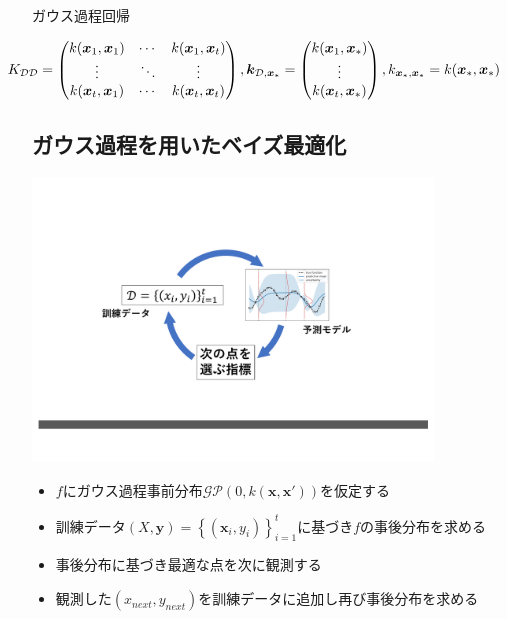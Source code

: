 \documentclass[dvipdfmx, 10.5pt]{beamer}
\begin{document}
\begin{frame}{\insertsubsection}
\begin{block}{ガウス過程回帰}
	\begin{tiny}
		\begin{align*}
			\hspace*{-15mm}
			K_{\mathcal{D} \mathcal{D}}
			=
			\begin{pmatrix}
				k(\bm x_{ 1}, \bm x_{ 1}) &
				\cdots &
				k(\bm x_{ 1}, \bm x_{ t}) \\
				\vdots &
				\ddots &
				\vdots \\ 	 
				k(\bm x_{ t}, \bm x_{ 1}) &
				\cdots &
				k(\bm x_{ t}, \bm x_{t}) 
			\end{pmatrix},
			\bm k_{\mathcal{D} ,{\bm x}_\ast}
			=
			\begin{pmatrix}
				k(\bm x_{ 1}, \bm x_\ast) \\
				\vdots \\
				k(\bm x_{ t}, \bm x_\ast) 
			\end{pmatrix},		 %
			k_{{\bm x}_\ast, {\bm x}_\ast}
			=
			k(\bm x_{\ast}, \bm x_{\ast})
		\end{align*}
	\end{tiny}
\end{block}
\end{frame}



\subsection{ガウス過程を用いたベイズ最適化}
\begin{frame}{\insertsubsection}
	\begin{center}
		\includegraphics[width=0.80\textwidth]{./Fig/GP.pdf}
	\end{center}
	\begin{itemize}
		\item $f$にガウス過程事前分布$\mathcal{GP}(0, k(\bm x, \bm x'))$を仮定する
		\item 訓練データ$(X, \bm y) = \left\{ (\bm x_i, y_i) \right\}_{i=1}^t$に基づき$f$の事後分布を求める
		\item 事後分布に基づき\alert{最適な点}を次に観測する
		\item 観測した$(x_{next}, y_{next})$を訓練データに追加し再び事後分布を求める
	\end{itemize}




\end{frame}
\end{document}
